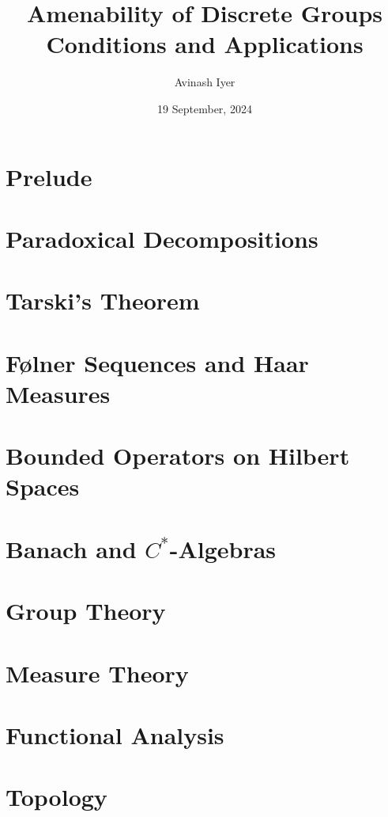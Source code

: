 \documentclass[10pt]{package2}
\title{Amenability of Discrete Groups\\ {\large Conditions and Applications}}
\author{Avinash Iyer}
\date{19 September, 2024}
\begin{document}
\maketitle
\tableofcontents
\chapter{Prelude}
\chapter{Paradoxical Decompositions}
\chapter{Tarski's Theorem}
\chapter{Følner Sequences and Haar Measures}
\chapter{Bounded Operators on Hilbert Spaces}
\chapter{Banach and $C^{\ast}$-Algebras}
\appendix
\chapter{Group Theory}
\chapter{Measure Theory}
\chapter{Functional Analysis}
\chapter{Topology}
\end{document}
